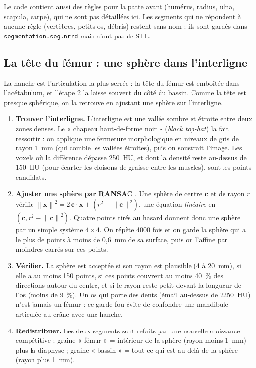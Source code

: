 \documentclass[11pt,a4paper]{article}
\newcommand{\fichier}[1]{\texttt{\small #1}}
\newcommand{\vb}[1]{\mathbf{#1}}
\newcommand{\norm}[1]{\left\lVert #1 \right\rVert}
\begin{document}
Le code contient aussi des règles pour la patte avant (humérus, radius, ulna, scapula, carpe), qui ne sont pas
détaillées ici. Les segments qui ne répondent à aucune règle (vertèbres, petits os, débris) restent sans nom : ils
sont gardés dans \fichier{segmentation.seg.nrrd} mais n'ont pas de STL.

\subsection{La tête du fémur : une sphère dans l'interligne}
\label{sec-tete}

La hanche est l'articulation la plus serrée : la tête du fémur est emboîtée dans l'acétabulum, et l'étape 2 la laisse
souvent du côté du bassin. Comme la tête est presque sphérique, on la retrouve en ajustant une sphère sur
l'interligne.
\begin{enumerate}
  \item \textbf{Trouver l'interligne.} L'interligne est une vallée sombre et étroite entre deux zones denses. Le
  « chapeau haut-de-forme noir » (\emph{black top-hat}) la fait ressortir : on applique une fermeture morphologique en
  niveaux de gris de rayon 1~mm (qui comble les vallées étroites), puis on soustrait l'image. Les voxels où la
  différence dépasse 250~HU, et dont la densité reste au-dessus de 150~HU (pour écarter les cloisons de graisse entre
  les muscles), sont les points candidats.
  \item \textbf{Ajuster une sphère par RANSAC} \cite{fischler1981}. Une sphère de centre $\vb{c}$ et de rayon $r$
  vérifie $\norm{\vb{x}}^2 = 2\,\vb{c}\cdot\vb{x} + (r^2 - \norm{\vb{c}}^2)$, une équation \emph{linéaire} en
  $(\vb{c}, r^2 - \norm{\vb{c}}^2)$. Quatre points tirés au hasard donnent donc une sphère par un simple système
  $4 \times 4$. On répète 4000 fois et on garde la sphère qui a le plus de points à moins de 0,6~mm de sa surface,
  puis on l'affine par moindres carrés sur ces points.
  \item \textbf{Vérifier.} La sphère est acceptée si son rayon est plausible (4 à 20~mm), si elle a au moins 150
  points, si ces points couvrent au moins 40~\% des directions autour du centre, et si le rayon reste petit devant la
  longueur de l'os (moins de 9~\%). Un os qui porte des dents (émail au-dessus de 2250~HU) n'est jamais un fémur :
  ce garde-fou évite de confondre une mandibule articulée au crâne avec une hanche.
  \item \textbf{Redistribuer.} Les deux segments sont refaits par une nouvelle croissance compétitive : graine
  « fémur » = intérieur de la sphère (rayon moins 1~mm) plus la diaphyse ; graine « bassin » = tout ce qui est au-delà
  de la sphère (rayon plus 1~mm).
\end{enumerate}
\end{document}
